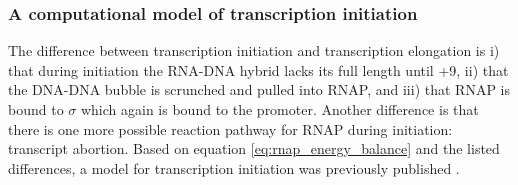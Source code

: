 \subsubsection{A computational model of transcription initiation}
The difference between transcription initiation and transcription elongation is
i) that during initiation the RNA-DNA hybrid lacks its full length until +9,
ii) that the DNA-DNA bubble is scrunched and pulled into RNAP, and iii) that
RNAP is bound to $\sigma$ which again is bound to the promoter. Another
difference is that there is one more possible reaction pathway for RNAP during
initiation: transcript abortion. Based on equation
\eqref{eq:rnap_energy_balance} and the listed differences, a model for
transcription initiation was previously published \cite{xue_kinetic_2008}.
